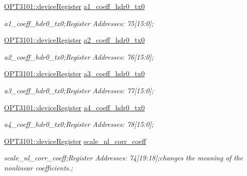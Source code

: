 \begin{DoxyCompactItemize}
\mbox{\hyperlink{class_o_p_t3101_1_1device_register}{O\+P\+T3101\+::device\+Register}} \mbox{\hyperlink{class_o_p_t3101_1_1registers_aef8ec6287aba1f316f417cb1b5fb2250}{a1\+\_\+coeff\+\_\+hdr0\+\_\+tx0}}
\begin{DoxyCompactList}\small\item\em a1\+\_\+coeff\+\_\+hdr0\+\_\+tx0;Register Addresses\+: 75\mbox{[}15\+:0\mbox{]}; \end{DoxyCompactList}\item 
\mbox{\hyperlink{class_o_p_t3101_1_1device_register}{O\+P\+T3101\+::device\+Register}} \mbox{\hyperlink{class_o_p_t3101_1_1registers_acc1559c33ebacbd59d615e1b98837801}{a2\+\_\+coeff\+\_\+hdr0\+\_\+tx0}}
\begin{DoxyCompactList}\small\item\em a2\+\_\+coeff\+\_\+hdr0\+\_\+tx0;Register Addresses\+: 76\mbox{[}15\+:0\mbox{]}; \end{DoxyCompactList}\item 
\mbox{\hyperlink{class_o_p_t3101_1_1device_register}{O\+P\+T3101\+::device\+Register}} \mbox{\hyperlink{class_o_p_t3101_1_1registers_adbf1d99edfca7b9865f3fc8cdbc71db1}{a3\+\_\+coeff\+\_\+hdr0\+\_\+tx0}}
\begin{DoxyCompactList}\small\item\em a3\+\_\+coeff\+\_\+hdr0\+\_\+tx0;Register Addresses\+: 77\mbox{[}15\+:0\mbox{]}; \end{DoxyCompactList}\item 
\mbox{\hyperlink{class_o_p_t3101_1_1device_register}{O\+P\+T3101\+::device\+Register}} \mbox{\hyperlink{class_o_p_t3101_1_1registers_acb5016f7bbd2532a8273d3257addb1cd}{a4\+\_\+coeff\+\_\+hdr0\+\_\+tx0}}
\begin{DoxyCompactList}\small\item\em a4\+\_\+coeff\+\_\+hdr0\+\_\+tx0;Register Addresses\+: 78\mbox{[}15\+:0\mbox{]}; \end{DoxyCompactList}\item 
\mbox{\hyperlink{class_o_p_t3101_1_1device_register}{O\+P\+T3101\+::device\+Register}} \mbox{\hyperlink{class_o_p_t3101_1_1registers_a8be7ea17637153d221e4198caea67452}{scale\+\_\+nl\+\_\+corr\+\_\+coeff}}
\begin{DoxyCompactList}\small\item\em scale\+\_\+nl\+\_\+corr\+\_\+coeff;Register Addresses\+: 74\mbox{[}19\+:18\mbox{]};changes the meaning of the nonlinear coefficients.; \end{DoxyCompactList}\item 

\end{DoxyCompactItemize}
